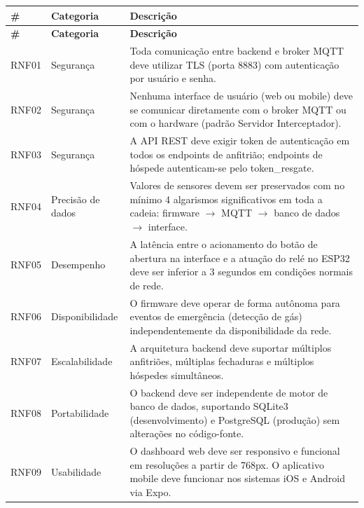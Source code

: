 \documentclass[12pt,a4paper]{article}
\begin{document}
\begin{longtable}{p{1.100cm} p{3.800cm} p{10.00cm}}
  \toprule
  \textbf{\#} & \textbf{Categoria} & \textbf{Descrição} \\
  \midrule
  \endfirsthead
  \toprule
  \textbf{\#} & \textbf{Categoria} & \textbf{Descrição} \\
  \midrule
  \endhead
  \bottomrule
  \endfoot

  RNF01 & Segurança & Toda comunicação entre backend e broker MQTT deve utilizar TLS
          (porta 8883) com autenticação por usuário e senha. \\[3pt]

  RNF02 & Segurança & Nenhuma interface de usuário (web ou mobile) deve se comunicar
          diretamente com o broker MQTT ou com o hardware (padrão Servidor Interceptador). \\[3pt]

  RNF03 & Segurança & A API REST deve exigir token de autenticação em todos os
          endpoints de anfitrião; endpoints de hóspede autenticam-se pelo token\_resgate. \\[3pt]

  RNF04 & Precisão de dados & Valores de sensores devem ser preservados com no mínimo
          4 algarismos significativos em toda a cadeia: firmware $\rightarrow$ MQTT
          $\rightarrow$ banco de dados $\rightarrow$ interface. \\[3pt]

  RNF05 & Desempenho & A latência entre o acionamento do botão de abertura na interface
          e a atuação do relé no ESP32 deve ser inferior a 3 segundos em condições
          normais de rede. \\[3pt]

  RNF06 & Disponibilidade & O firmware deve operar de forma autônoma para eventos de
          emergência (detecção de gás) independentemente da disponibilidade da rede. \\[3pt]

  RNF07 & Escalabilidade & A arquitetura backend deve suportar múltiplos anfitriões,
          múltiplas fechaduras e múltiplos hóspedes simultâneos. \\[3pt]

  RNF08 & Portabilidade & O backend deve ser independente de motor de banco de dados,
          suportando SQLite3 (desenvolvimento) e PostgreSQL (produção) sem alterações
          no código-fonte. \\[3pt]

  RNF09 & Usabilidade & O dashboard web deve ser responsivo e funcional em resoluções
          a partir de 768px. O aplicativo mobile deve funcionar nos sistemas iOS e
          Android via Expo. \\[3pt]


\end{longtable}
\end{document}
